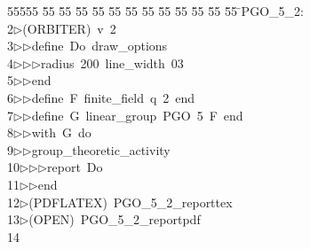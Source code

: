 %
%
\begin{tabbing}
55555 \= 55 \= 55 \= 55 \= 55 \= 55 \= 55 \= 55 \= 55 \= 55 \= 55 \= 55 \= 55 \= \>PGO\_5\_2:\\[0pt]
2\>$\triangleright$\>(ORBITER)\ v\ 2\ \\[0pt]
3\>$\triangleright$\>$\triangleright$\>define\ Do\ draw\_options\ \\[0pt]
4\>$\triangleright$\>$\triangleright$\>$\triangleright$\>radius\ 200\ line\_width\ 03\ \\[0pt]
5\>$\triangleright$\>$\triangleright$\>end\ \\[0pt]
6\>$\triangleright$\>$\triangleright$\>define\ F\ finite\_field\ q\ 2\ end\ \\[0pt]
7\>$\triangleright$\>$\triangleright$\>define\ G\ linear\_group\ PGO\ 5\ F\ end\ \\[0pt]
8\>$\triangleright$\>$\triangleright$\>with\ G\ do\ \\[0pt]
9\>$\triangleright$\>$\triangleright$\>group\_theoretic\_activity\ \\[0pt]
10\>$\triangleright$\>$\triangleright$\>$\triangleright$\>report\ Do\ \\[0pt]
11\>$\triangleright$\>$\triangleright$\>end\\[0pt]
12\>$\triangleright$\>(PDFLATEX)\ PGO\_5\_2\_reporttex\\[0pt]
13\>$\triangleright$\>(OPEN)\ PGO\_5\_2\_reportpdf\\[0pt]
14\>\end{tabbing}
